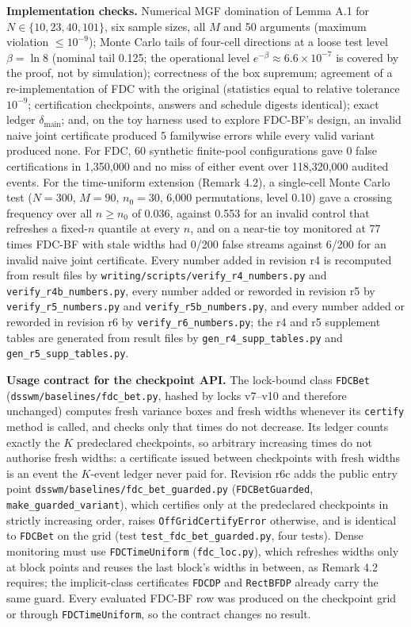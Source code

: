 \documentclass[sigconf,anonymous,review]{acmart}
\newcommand{\dmain}{\delta_{\text{main}}}
\begin{document}
\textbf{Implementation checks.} Numerical MGF domination of Lemma A.1 for $N \in \{10, 23, 40, 101\}$, six sample sizes, all $M$ and 50 arguments (maximum violation $\le 10^{-9}$); Monte Carlo tails of four-cell directions at a loose test level $\beta = \ln 8$ (nominal tail 0.125; the operational level $e^{-\beta} \approx 6.6 \times 10^{-7}$ is covered by the proof, not by simulation); correctness of the box supremum; agreement of a re-implementation of FDC with the original (statistics equal to relative tolerance $10^{-9}$; certification checkpoints, answers and schedule digests identical); exact ledger $\dmain$; and, on the toy harness used to explore FDC-BF's design, an invalid naive joint certificate produced 5 familywise errors while every valid variant produced none. For FDC, 60 synthetic finite-pool configurations gave 0 false certifications in 1,350,000 and no miss of either event over 118,320,000 audited events. For the time-uniform extension (Remark 4.2), a single-cell Monte Carlo test ($N = 300$, $M = 90$, $n_0 = 30$, 6,000 permutations, level 0.10) gave a crossing frequency over all $n \ge n_0$ of 0.036, against 0.553 for an invalid control that refreshes a fixed-$n$ quantile at every $n$, and on a near-tie toy monitored at 77 times FDC-BF with stale widths had 0/200 false streams against 6/200 for an invalid naive joint certificate. Every number added in revision r4 is recomputed from result files by \texttt{writing/scripts/verify\_r4\_numbers.py} and \texttt{verify\_r4b\_numbers.py}, every number added or reworded in revision r5 by \texttt{verify\_r5\_numbers.py} and \texttt{verify\_r5b\_numbers.py}, and every number added or reworded in revision r6 by \texttt{verify\_r6\_numbers.py}; the r4 and r5 supplement tables are generated from result files by \texttt{gen\_r4\_supp\_tables.py} and \texttt{gen\_r5\_supp\_tables.py}.

\textbf{Usage contract for the checkpoint API.} The lock-bound class \texttt{FDCBet} (\texttt{dsswm/baselines/fdc\_bet.py}, hashed by locks v7--v10 and therefore unchanged) computes fresh variance boxes and fresh widths whenever its \texttt{certify} method is called, and checks only that times do not decrease. Its ledger counts exactly the $K$ predeclared checkpoints, so arbitrary increasing times do not authorise fresh widths: a certificate issued between checkpoints with fresh widths is an event the $K$-event ledger never paid for. Revision r6c adds the public entry point \texttt{dsswm/baselines/fdc\_bet\_guarded.py} (\texttt{FDCBetGuarded}, \texttt{make\_guarded\_variant}), which certifies only at the predeclared checkpoints in strictly increasing order, raises \texttt{OffGridCertifyError} otherwise, and is identical to \texttt{FDCBet} on the grid (test \texttt{test\_fdc\_bet\_guarded.py}, four tests). Dense monitoring must use \texttt{FDCTimeUniform} (\texttt{fdc\_loc.py}), which refreshes widths only at block points and reuses the last block's widths in between, as Remark 4.2 requires; the implicit-class certificates \texttt{FDCDP} and \texttt{RectBFDP} already carry the same guard. Every evaluated FDC-BF row was produced on the checkpoint grid or through \texttt{FDCTimeUniform}, so the contract changes no result.
\end{document}
